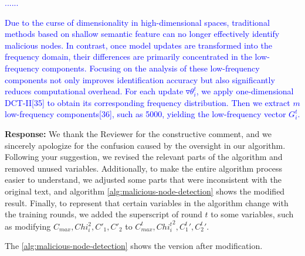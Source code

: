 \documentclass[a4paper,twoside,11pt,dvipsnames]{reviewresponse}
\begin{document}
\textcolor{blue}{......}

\textcolor{blue}{
Due to the curse of dimensionality in high-dimensional spaces, traditional methods based on shallow semantic
feature can no longer effectively identify malicious nodes. In contrast, once model updates are transformed into the frequency domain, their differences are primarily concentrated in the low-frequency components. Focusing on the analysis of these low-frequency components not only improves identification accuracy but also significantly reduces computational overhead. For each update \(\triangledown \theta_i^t\), we apply one-dimensional DCT-II[35] to obtain its corresponding frequency distribution. Then we extract $m$ low-frequency components[36], such as 5000, yielding the low-frequency vector $G_i^t$.
}







\textbf{Response:} We thank the Reviewer for the constructive comment, and
we sincerely apologize for the confusion caused by the oversight in our algorithm.
Following your suggestion, we revised the relevant parts of the algorithm and removed unused variables.
Additionally, to make the entire algorithm process easier to understand, we adjusted some parts that were inconsistent with the original text, and algorithm \ref{alg:malicious-node-detection} shows the modified result.
Finally, to represent that certain variables in the algorithm change with the training rounds, we added the superscript of round $t$ to some variables, such as modifying $C_{max}, Chi_i^2, {C'_1}, {C'_2}$ to $C^t_{max}, {Chi^t_i}^2, {C^t_1}', {C^t_2}'$.

The \ref{alg:malicious-node-detection} shows the version after modification.
\end{document}
